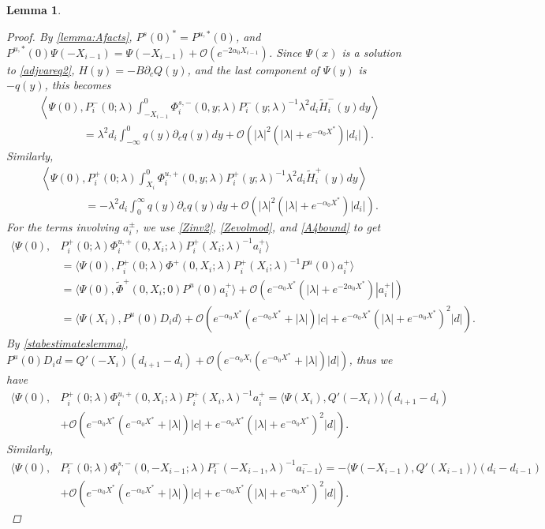 \documentclass[12pt]{elsarticle}
\theoremstyle{plain}
\newtheorem{lemma}[theorem]{Lemma}
\theoremstyle{definition}
\theoremstyle{remark}
\numberwithin{theorem}{section}
\numberwithin{equation}{section}
\begin{document}
\begin{lemma}
\begin{proof}
By \cref{lemma:Afacts}, $P^s(0)^* = P^{u,*}(0)$, and $P^{u,*}(0) \Psi(-X_{i-1}) = \Psi(-X_{i-1}) + \mathcal{O}(e^{-2\alpha_0 X_{i-1}})$. Since $\Psi(x)$ is a solution to \cref{adjvareq2}, $H(y) = -B \partial_c Q(y)$, and the last component of $\Psi(y)$ is $-q(y)$, this becomes
\begin{align*}
&\left\langle \Psi(0), P_i^-(0; \lambda) \int_{-X_{i-1}}^0 \Phi_i^{s,-}(0, y; \lambda) P_i^-(y; \lambda)^{-1} \lambda^2 d_i \tilde{H}_i^-(y) dy \right\rangle \\
&\qquad\qquad = \lambda^2 d_i \int_{-\infty}^0 q(y) \partial_c q(y) dy + \mathcal{O}(|\lambda|^2( |\lambda| + {e^{-\alpha_0 X^*}})|d_i|).
\end{align*}
Similarly,
\begin{align*}
&\left\langle \Psi(0), P_i^+(0; \lambda) \int_{X_i}^0 \Phi_i^{u,+}(0, y; \lambda) P_i^+(y; \lambda)^{-1} \lambda^2 d_i \tilde{H}_i^+(y) dy \right\rangle \\
&\qquad\qquad = -\lambda^2 d_i \int_0^\infty q(y) \partial_c q(y) dy + \mathcal{O}(|\lambda|^2( |\lambda| + {e^{-\alpha_0 X^*}})|d_i|).
\end{align*}
For the terms involving $a_i^\pm$, we use \cref{Zinv2}, \cref{Zevolmod}, and \cref{A4bound} to get
\begin{align*}
\langle \Psi(0), &P_i^+(0; \lambda) \Phi_i^{u,+}(0, X_i; \lambda) P_i^+(X_i; \lambda)^{-1} a_i^+ \rangle \\
&= \langle \Psi(0), P_i^+(0; \lambda) \Phi^+(0, X_i; \lambda) P_i^+(X_i; \lambda)^{-1}
P^u(0) a_i^+ \rangle \\
&= \langle \Psi(0), \tilde{\Phi}^+(0, X_i; 0) P^u(0) a_i^+ \rangle + \mathcal{O}(e^{-\alpha_0 X^*}(|\lambda| + e^{-2 \alpha_0 X^*})|a_i^+|) \\
&= \langle \Psi(X_i), P^u(0) D_i d \rangle + \mathcal{O}\left(e^{-\alpha_0 X^*} (e^{-\alpha_0 X^*} + |\lambda|)|c| + e^{-\alpha_0 X^*}(|\lambda| + e^{-\alpha_0 X^*})^2 |d|  \right).
\end{align*}
By \cref{stabestimateslemma}, $P^u(0) D_i d = Q'(-X_i)(d_{i+1} - d_i ) + \mathcal{O}( e^{-\alpha_0 X_i} (e^{-\alpha_0 X^*} + |\lambda| )|d|)$, thus we have
\begin{align*}
\langle \Psi(0), &P_i^+(0; \lambda) \Phi_i^{u,+}(0, X_i; \lambda) P_i^+(X_i, \lambda)^{-1} a_i^+ = \langle \Psi(X_i), Q'(-X_i) \rangle (d_{i+1} - d_i ) \\
&+ \mathcal{O}\left(e^{-\alpha_0 X^*} (e^{-\alpha_0 X^*} + |\lambda|)|c| + e^{-\alpha_0 X^*}(|\lambda| + e^{-\alpha_0 X^*})^2 |d|  \right).
\end{align*}
Similarly,
\begin{align*}
\langle \Psi(0), &P_i^-(0; \lambda) \Phi_i^{s,-}(0, -X_{i-1}; \lambda) P_i^-(-X_{i-1}, \lambda)^{-1} a_{i-1}^- \rangle = -\langle \Psi(-X_{i-1}), Q'(X_{i-1}) \rangle (d_i - d_{i-1} ) \\
&+ \mathcal{O}\left(e^{-\alpha_0 X^*} (e^{-\alpha_0 X^*} + |\lambda|)|c| + e^{-\alpha_0 X^*}(|\lambda| + e^{-\alpha_0 X^*})^2 |d| \right).
\end{align*}


\end{proof}
\end{lemma}
\end{document}
